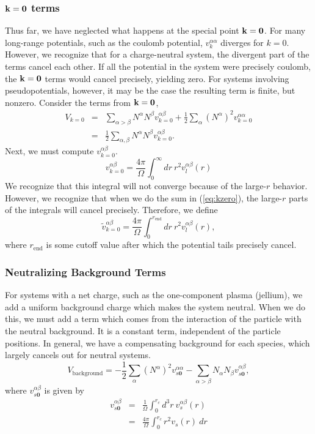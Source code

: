 \subsubsection{$\mathbf{k}=\mathbf{0}$ terms}
Thus far, we have neglected what happens at the special point $\mathbf{k} =
\mathbf{0}$.  For many long-range potentials, such as the coulomb
potential, $v_k^{\alpha \alpha}$ diverges for $k=0$.  However, we
recognize that for a charge-neutral system, the divergent part of the
terms cancel each other.  If all the potential in the system were
precisely coulomb, the $\mathbf{k}=\mathbf{0}$ terms would cancel precisely,
yielding zero.  For systems involving pseudopotentials, however, it
may be the case the resulting term is finite, but nonzero.  Consider
the terms from $\mathbf{k}=\mathbf{0}$,
\begin{eqnarray}
V_{k=0} & = & \sum_{\alpha>\beta} N^\alpha N^\beta v^{\alpha \beta}_{k=0}
+ \frac{1}{2} \sum_\alpha \left(N^{\alpha}\right)^2 v^{\alpha\alpha}_{k=0} \\
& = & \frac{1}{2} \sum_{\alpha,\beta} N^\alpha N^\beta v^{\alpha
  \beta}_{k=0}.
\label{eq:kzero}
\end{eqnarray}
Next, we must compute $v^{\alpha \beta}_{k=0}$.  
\begin{equation}
v^{\alpha \beta}_{k=0} = \frac{4 \pi}{\Omega} \int_0^\infty dr\ r^2
v_l^{\alpha \beta}(r)
\end{equation}
We recognize that this integral will not converge because of the
large-$r$ behavior.  However, we recognize that when we do the sum in
(\ref{eq:kzero}), the large-$r$ parts of the integrals will cancel
precisely.  Therefore, we define
\begin{equation}
\tilde{v}^{\alpha \beta}_{k=0} = \frac{4 \pi}{\Omega} 
\int_0^{r_\text{end}} dr\ r^2 v_l^{\alpha \beta}(r),
\end{equation}
where $r_\text{end}$ is some cutoff value after which the potential
tails precisely cancel.

\subsubsection{Neutralizing Background Terms}
For systems with a net charge, such as the one-component plasma
(jellium), we add a uniform background charge which makes the system
neutral.  When we do this, we must add a term which comes from the
interaction of the particle with the neutral background.  It is a
constant term, independent of the particle positions.  In general, we
have a compensating background for each species, which largely cancels
out for neutral systems.
\begin{equation}
V_\text{background} = -\frac{1}{2} \sum_\alpha \left(N^\alpha\right)^2 
v^{\alpha \alpha}_{s\mathbf{0}}
-\sum_{\alpha > \beta} N_\alpha N_\beta
v^{\alpha\beta}_{s\mathbf{0}},
\end{equation}
where $v^{\alpha \beta}_{s\mathbf{0}}$ is given by
\begin{eqnarray}
v^{\alpha \beta}_{s\mathbf{0}} & = & \frac{1}{\Omega} \int_0^{r_c} d^3 r\ 
v^{\alpha \beta}_s(r) \\
& = & \frac{4 \pi}{\Omega} \int_0^{r_c} r^2 v_s(r) \ dr \nonumber
\end{eqnarray}


